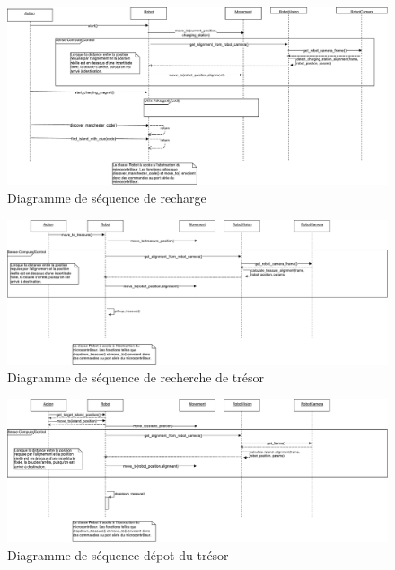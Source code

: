 \begin{landscape}
\begin{figure}
  \centering
  \includegraphics[scale=0.5, angle=0]{resources/diagrams/rechargeAction.pdf}
  \caption{Diagramme de séquence de recharge}
\end{figure}

\begin{figure}
  \centering
  \includegraphics[scale=0.4, angle=0]{resources/diagrams/findTreasureAction.pdf}
  \caption{Diagramme de séquence de recherche de trésor}
\end{figure}

\begin{figure}
  \centering
  \includegraphics[scale=0.5, angle=0]{resources/diagrams/depositAction.pdf}
  \caption{Diagramme de séquence dépot du trésor}
\end{figure}
\end{landscape}
